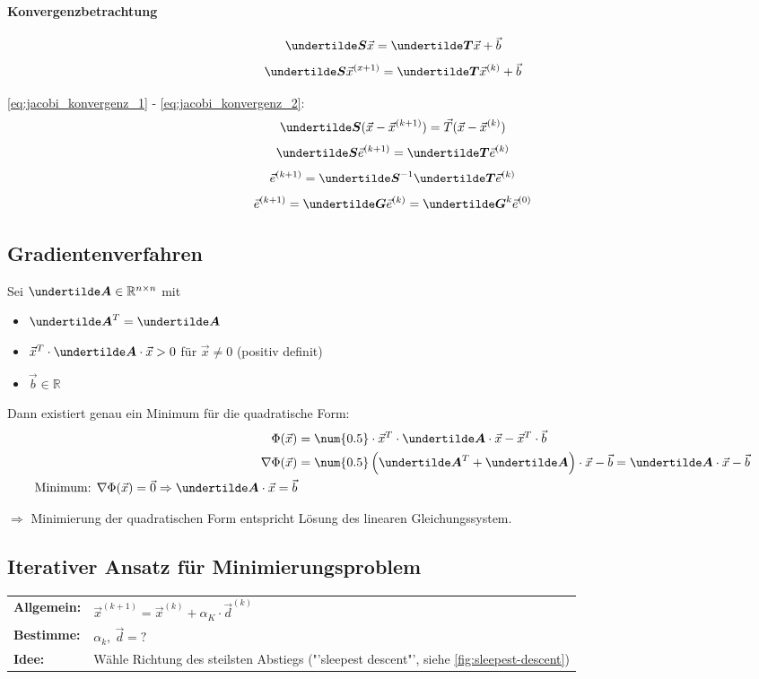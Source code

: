 \paragraph{Konvergenzbetrachtung}
\begin{equation}
	\ma{S} \vec{x} = \ma{T} \vec{x} + \vec{b}
	\label{eq:jacobi_konvergenz_1}
\end{equation}
\begin{equation}
	\ma{S} \vec{x}^{(x + 1)} = \ma{T} \vec{x}^{(k)} + \vec{b}
	\label{eq:jacobi_konvergenz_2}
\end{equation}

\ref{eq:jacobi_konvergenz_1} - \ref{eq:jacobi_konvergenz_2}:
\[\ma{S} (\vec{x} - \vec{x}^{(k + 1)}) = \vec{T} (\vec{x} - \vec{x}^{(k)})\]
\[\ma{S} \vec{e}^{(k + 1)} = \ma{T} \vec{e}^{(k)}\]
\[\vec{e}^{(k + 1)} = \ma{S}^{-1} \ma{T} \vec{e}^{(k)}\]
\[\vec{e}^{(k + 1)} = \ma{G} \vec{e}^{(k)} = \ma{G}^k \vec{e}^{(0)}\]

\subsection{Gradientenverfahren}
Sei $ \ma{A} \in \mathbb{R}^{n\times n} $ mit
\begin{itemize}
	\item $\ma{A}^T = \ma{A}$
	\item $\vec{x}^T \cdot \ma{A} \cdot \vec{x} > 0$ für $\vec{x} \neq 0$ (positiv definit)
	\item $\vec{b} \in \mathbb{R}$
\end{itemize}

Dann existiert genau ein Minimum für die quadratische Form:
\begin{align*}
	\Phi(\vec{x}) &= \num{0.5} \cdot \vec{x}^T \cdot \ma{A} \cdot \vec{x} - \vec{x}^T \cdot \vec{b}\\
	\nabla \Phi(\vec{x}) &= \num{0.5} \left( \ma{A}^T + \ma{A} \right) \cdot \vec{x} - \vec{b} = \ma{A} \cdot \vec{x} - \vec{b}\\
	\text{Minimum: } \nabla \Phi(\vec{x}) = \vec{0} \Rightarrow \ma{A} \cdot \vec{x} = \vec{b}
\end{align*}

$\Rightarrow$ Minimierung der quadratischen Form entspricht Lösung des linearen Gleichungssystem.

\subsection{Iterativer Ansatz für Minimierungsproblem}
\begin{tabular}{ll}
	\textbf{Allgemein:} & $\vec{x}^{(k+1)} = \vec{x}^{(k)} + \alpha_K \cdot \vec{d}^{(k)}$\\
	\textbf{Bestimme:} & $\alpha_k,\ \vec{d} = ?$\\
	\textbf{Idee:} & Wähle Richtung des steilsten Abstiegs ("'sleepest descent"', siehe \autoref{fig:sleepest-descent})\\
\end{tabular}

